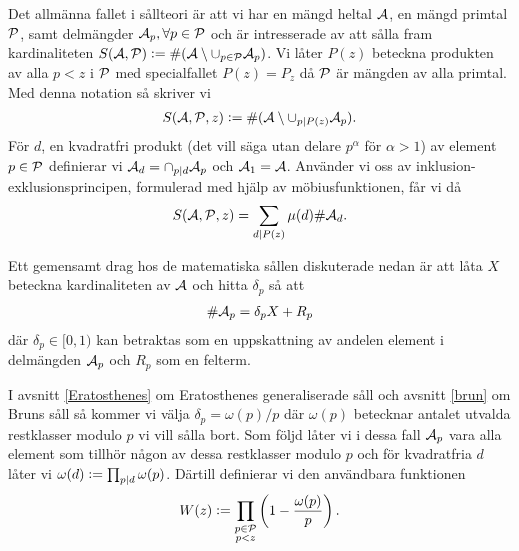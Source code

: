 Det allmänna fallet i sållteori är att vi har en mängd heltal \(\A\), en mängd primtal \(\P\), samt delmängder \(\A_p, \forall p \in \P\) och är intresserade av att sålla fram kardinaliteten \(S(\A, \P) :=\card{(\A \setminus \cup_{p \in \P} \A_p)}\). Vi låter \(P(z)\) beteckna produkten av alla \(p < z\) i \(\P\) med specialfallet \(P(z) = P_z\) då \(\P\) är mängden av alla primtal. Med denna notation så skriver vi 
\begin{align*}
    \S{A}{P}{z} := \card{(\A \setminus \cup_{p \divides P(z)} \A_p)} .
\end{align*}
För \(d\), en kvadratfri produkt (det vill säga utan delare \(p^\alpha\) för \(\alpha > 1\)) av element \(p \in \P\) definierar vi \(\A_d = \cap_{p \divides d} \A_p\) och \(\A_1 = \A\). Använder vi oss av inklusion-exklusionsprincipen, formulerad med hjälp av möbiusfunktionen, får vi då
\begin{align} \label{inclusionexclusion}
    \S{A}{P}{z} = \sum_{d \divides P(z)} \mu(d) \card{\A_d} .
\end{align} %

Ett gemensamt drag hos de matematiska sållen diskuterade nedan är att låta \(X\) beteckna kardinaliteten av \(\A\) och hitta \(\delta_p\) så att
\begin{align} \label{deltaX}
    \card{\A_p} = \delta_p X + R_p
\end{align}
där \(\delta_p \in [0, 1)\) kan betraktas som en uppskattning av andelen element i delmängden \(\A_p\) och \(R_p\) som en felterm. %

I avsnitt \ref{Eratosthenes} om Eratosthenes generaliserade såll och avsnitt \ref{brun} om Bruns såll så kommer vi välja \(\delta_p = \omega(p) / p\) där \(\omega(p)\) betecknar antalet utvalda restklasser modulo \(p\) vi vill sålla bort. Som följd låter vi i dessa fall \(\A_p\) vara alla element som tillhör någon av dessa restklasser modulo $p$ och för kvadratfria $d$ låter vi \(\omega(d) := \prod_{p \divides d} \omega(p)\). Därtill definierar vi den användbara funktionen 
\begin{align} \label{Wfunc}
    W(z) := \prod_{\substack{p \in \P \\ p < z}}\left(1 - \frac{\omega(p)}{p}\right).
\end{align} 




